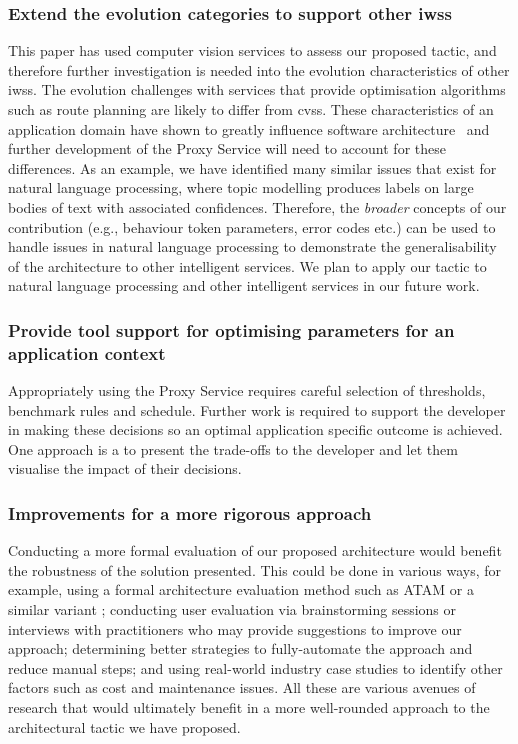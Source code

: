 \subsubsection{Extend the evolution categories to support other \glspl{iws}} This paper has used computer vision services to assess our proposed tactic, and therefore further investigation is needed into the evolution characteristics of other \glspl{iws}. The evolution challenges with services that provide optimisation algorithms such as route planning are likely to differ from \glspl{cvs}. These characteristics of an application domain have shown to greatly influence software architecture~\citep{Barnett:2018Kx} and further development of the Proxy Service will need to account for these differences. As an example, we have identified many similar issues that exist for natural language processing, where topic modelling produces labels on large bodies of text with associated confidences. Therefore, the \textit{broader} concepts of our contribution (e.g., behaviour token parameters, error codes etc.) can be used to handle issues in natural language processing to demonstrate the generalisability of the architecture to other intelligent services. We plan to apply our tactic to natural language processing and other intelligent services  in our future work.

\subsubsection{Provide tool support for optimising parameters for an application context} Appropriately using the Proxy Service requires careful selection of thresholds, benchmark rules and schedule. Further work is required to support the developer in making these decisions so an optimal application specific outcome is achieved. One approach is a to present the trade-offs to the developer and let them visualise the impact of their decisions. 

\subsubsection{Improvements for a more rigorous approach} Conducting a more formal evaluation of our proposed architecture would benefit the robustness of the solution presented. This could be done in various ways, for example, using a formal architecture evaluation method such as ATAM \citep{Kazman2000} or a similar variant \citep{Bouwers2010}; conducting user evaluation via brainstorming sessions or interviews with practitioners who may provide suggestions to improve our approach; determining better strategies to fully-automate the approach and reduce manual steps; and using real-world industry case studies to identify other factors such as cost and maintenance issues. All these are various avenues of research that would ultimately benefit in a more well-rounded approach to the architectural tactic we have proposed.


